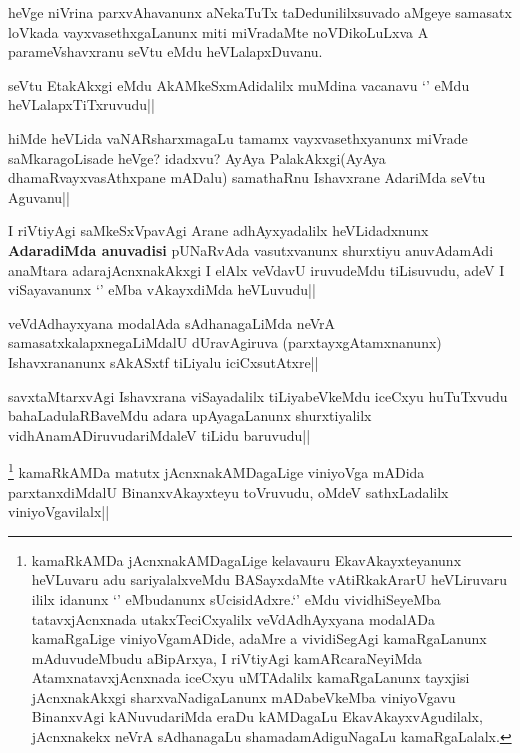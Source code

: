 
\begin{artha}
heVge niVrina parxvAhavanunx aNekaTuTx taDedunililxsuvado aMgeye samasatx loVkada vayxvasethxgaLanunx miti miVradaMte noVDikoLuLxva A parameVshavxranu seVtu eMdu heVLalapxDuvanu.
\end{artha}

\begin{artha}
seVtu EtakAkxgi eMdu AkAMkeSxmAdidalilx muMdina vacanavu `\stext' eMdu heVLalapxTiTxruvudu||
\end{artha}

\begin{artha}
hiMde heVLida vaNARsharxmagaLu tamamx vayxvasethxyanunx miVrade saMkaragoLisade heVge? idadxvu? AyAya PalakAkxgi(AyAya dhamaRvayxvasAthxpane mADalu) samathaRnu Ishavxrane AdariMda seVtu Aguvanu||
\end{artha}


\begin{artha}
I riVtiyAgi saMkeSxVpavAgi Arane adhAyxyadalilx heVLidadxnunx \textbf{AdaradiMda anuvadisi}
pUNaRvAda vasutxvanunx shurxtiyu anuvAdamAdi anaMtara adarajAcnxnakAkxgi I elAlx veVdavU iruvudeMdu tiLisuvudu, adeV I viSayavanunx `\stext' eMba vAkayxdiMda heVLuvudu||
\end{artha}


\begin{artha}
veVdAdhayxyana modalAda sAdhanagaLiMda neVrA samasatxkalapxnegaLiMdalU dUravAgiruva (parxtayxgAtamxnanunx) Ishavxrananunx sAkASxtf tiLiyalu iciCxsutAtxre||
\end{artha}

\begin{artha}
savxtaMtarxvAgi Ishavxrana viSayadalilx tiLiyabeVkeMdu iceCxyu huTuTxvudu bahaLadulaRBaveMdu adara upAyagaLanunx shurxtiyalilx vidhAnamADiruvudariMdaleV tiLidu baruvudu||
\end{artha}


\begin{artha}
\footnote{kamaRkAMDa jAcnxnakAMDagaLige kelavauru EkavAkayxteyanunx heVLuvaru adu sariyalalxveMdu BASayxdaMte vAtiRkakArarU heVLiruvaru ililx idanunx `\stext' eMbudanunx sUcisidAdxre.`\stext' eMdu vividhiSeyeMba tatavxjAcnxnada utakxTeciCxyalilx veVdAdhAyxyana modalADa kamaRgaLige viniyoVgamADide, adaMre a vividiSegAgi kamaRgaLanunx mAduvudeMbudu aBipArxya, I riVtiyAgi kamARcaraNeyiMda AtamxnatavxjAcnxnada iceCxyu uMTAdalilx kamaRgaLanunx tayxjisi jAcnxnakAkxgi sharxvaNadigaLanunx mADabeVkeMba viniyoVgavu BinanxvAgi kANuvudariMda eraDu kAMDagaLu EkavAkayxvAgudilalx, jAcnxnakekx neVrA sAdhanagaLu shamadamAdiguNagaLu kamaRgaLalalx.} kamaRkAMDa matutx jAcnxnakAMDagaLige viniyoVga mADida parxtanxdiMdalU BinanxvAkayxteyu toVruvudu, oMdeV sathxLadalilx viniyoVgavilalx||
\end{artha}

